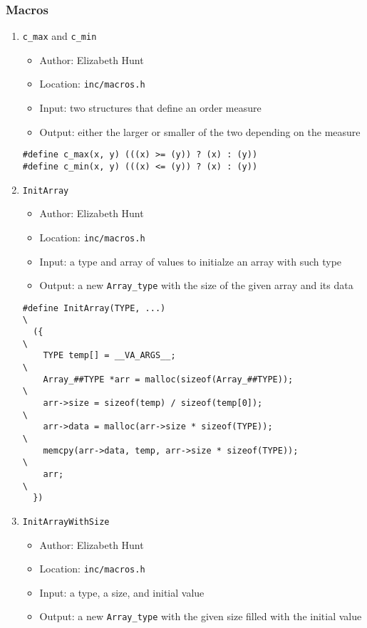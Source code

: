 \documentclass[11pt]{article}
\begin{document}
\subsubsection{Macros}
\label{sec:orgb835bfa}
\begin{enumerate}
\item \texttt{c\_max} and \texttt{c\_min}
\label{sec:org9ca763b}
\begin{itemize}
\item Author: Elizabeth Hunt
\item Location: \texttt{inc/macros.h}
\item Input: two structures that define an order measure
\item Output: either the larger or smaller of the two depending on the measure
\end{itemize}

\begin{verbatim}
#define c_max(x, y) (((x) >= (y)) ? (x) : (y))
#define c_min(x, y) (((x) <= (y)) ? (x) : (y))
\end{verbatim}

\item \texttt{InitArray}
\label{sec:org3454dab}
\begin{itemize}
\item Author: Elizabeth Hunt
\item Location: \texttt{inc/macros.h}
\item Input: a type and array of values to initialze an array with such type
\item Output: a new \texttt{Array\_type} with the size of the given array and its data
\end{itemize}

\begin{verbatim}
#define InitArray(TYPE, ...)                                                   \
  ({                                                                           \
    TYPE temp[] = __VA_ARGS__;                                                 \
    Array_##TYPE *arr = malloc(sizeof(Array_##TYPE));                          \
    arr->size = sizeof(temp) / sizeof(temp[0]);                                \
    arr->data = malloc(arr->size * sizeof(TYPE));                              \
    memcpy(arr->data, temp, arr->size * sizeof(TYPE));                         \
    arr;                                                                       \
  })
\end{verbatim}

\item \texttt{InitArrayWithSize}
\label{sec:orga4ec165}
\begin{itemize}
\item Author: Elizabeth Hunt
\item Location: \texttt{inc/macros.h}
\item Input: a type, a size, and initial value
\item Output: a new \texttt{Array\_type} with the given size filled with the initial value
\end{itemize}


\end{enumerate}
\end{document}
